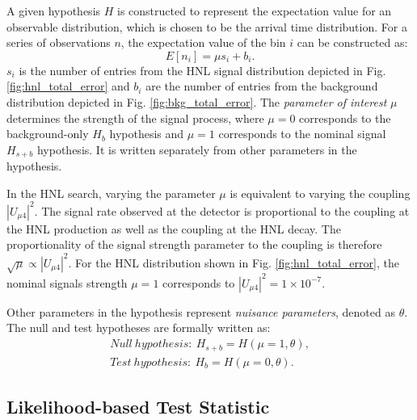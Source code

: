A given hypothesis $H$ is constructed to represent the expectation value for an observable distribution, which is chosen to be the arrival time distribution.
For a series of observations $n$, the expectation value of the bin $i$ can be constructed as:
\begin{equation}
\label{eq:expectation}
    E[n_i] = \mu s_i + b_i.
\end{equation}
$s_i$ is the number of entries from the HNL signal distribution depicted in Fig. \ref{fig:hnl_total_error} and $b_i$ are the number of entries from the background distribution depicted in Fig. \ref{fig:bkg_total_error}.
The \textit{parameter of interest} $\mu$ determines the strength of the signal process, where $\mu = 0$ corresponds to the background-only $H_{b}$ hypothesis and $\mu = 1$ corresponds to the nominal signal $H_{s+b}$ hypothesis.
It is written separately from other parameters in the hypothesis.

In the HNL search, varying the parameter $\mu$ is equivalent to varying the coupling $|U_{\mu4}|^{2}$.
The signal rate observed at the detector is proportional to the coupling at the HNL production as well as the coupling at the HNL decay.
The proportionality of the signal strength parameter to the coupling is therefore $\sqrt{\mu} \propto |U_{\mu4}|^{2}$.
For the HNL distribution shown in Fig. \ref{fig:hnl_total_error}, the nominal signals strength $\mu = 1$ corresponds to $|U_{\mu4}|^{2}= 1 \times 10^{-7}$.

Other parameters in the hypothesis represent \textit{nuisance parameters}, denoted as $\theta$.
The null and test hypotheses are formally written as:
\begin{align}
    Null\ hypothesis:\ H_{s+b} = H (\mu = 1, \theta),\\
    Test\ hypothesis:\ H_{b} = H (\mu = 0, \theta).
\end{align}

\subsection{Likelihood-based Test Statistic}
\label{sec:llh_test}


